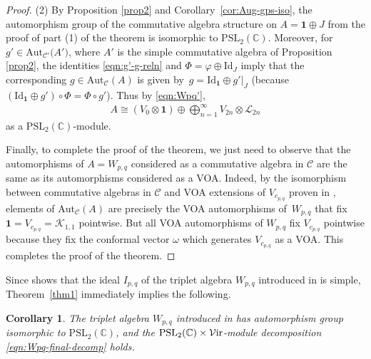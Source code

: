 \documentclass[pdftex]{sigma}
\numberwithin{equation}{section}
\newtheorem{Corollary}[Theorem]{Corollary}
\theoremstyle{definition}
\begin{document}
\begin{proof}
(2) By Proposition \ref{prop2} and Corollary~\ref{cor:Aug-gps-iso}, the automorphism group of the commutative algebra structure on $A=\mathbf{1}\oplus J$ from the proof of part (1) of the theorem is isomorphic to $\mathrm{PSL}_2(\mathbb{C})$. Moreover, for $g'\in\mathrm{Aut}_{\mathcal{C}'}\bigl(A'\bigr)$, where $A'$ is the simple commutative algebra of Proposition \ref{prop2}, the identities \eqref{eqn:g'-g-reln} and $\Phi=\varphi\oplus\mathrm{Id}_J$ imply that the corresponding $g\in\mathrm{Aut}_\mathcal{C}(A)$ is given by~${g=\mathrm{Id}_\mathbf{1}\oplus g'\vert_J}$ (because $(\mathrm{Id}_\mathbf{1}\oplus g')\circ\Phi=\Phi\circ g'$). Thus by \eqref{eqn:Wpq'},
\begin{gather*}
A\cong (V_0\otimes\mathbf{1})\oplus\bigoplus_{n=1}^\infty V_{2n}\otimes\mathcal{L}_{2n}
\end{gather*}
as a $\mathrm{PSL}_2(\mathbb{C})$-module.

Finally, to complete the proof of the theorem, we just need to observe that the automorphisms of $A=W_{p,q}$ considered as a commutative algebra in $\mathcal{C}$ are the same as its automorphisms considered as a VOA. Indeed, by the isomorphism between commutative algebras in $\mathcal{C}$ and VOA extensions of $V_{c_{p,q}}$ proven in \cite{HKL}, elements of $\mathrm{Aut}_\mathcal{C}(A)$ are precisely the VOA automorphisms of~$W_{p,q}$ that fix $\mathbf{1}=V_{c_{p,q}}=\mathcal{K}_{1,1}$ pointwise. But all VOA automorphisms of $W_{p,q}$ fix $V_{c_{p,q}}$ pointwise because they fix the conformal vector $\omega$ which generates $V_{c_{p,q}}$ as a VOA. This completes the proof of the theorem.
\end{proof}

Since \cite[Theorem 5.4]{TW2} shows that the ideal $I_{p,q}$ of the triplet algebra $W_{p,q}$ introduced in \cite{FGST1-Log} is simple, Theorem~\ref{thm1} immediately implies the following.

\begin{Corollary}\label{cor:Wpq-aut-gp}
The triplet algebra $W_{p,q}$ introduced in {\rm\cite{FGST1-Log}} has automorphism group isomorphic to $\mathrm{PSL}_2(\mathbb{C})$, and the $\mathrm{PSL}_2(\mathbb{C})\times\mathcal{V}{\rm ir}$-module decomposition \eqref{eqn:Wpq-final-decomp} holds.
\end{Corollary}
\end{document}
